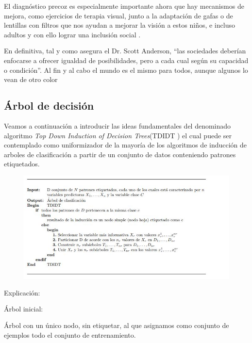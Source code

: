 \documentclass[10pt]{article}
\begin{document}
El diagnóstico precoz es especialmente importante ahora que hay mecanismos de mejora, como ejercicios de terapia visual, junto a la adaptación de gafas o de lentillas con filtros que nos ayudan a mejorar la visión a estos niños, e incluso adultos y con ello lograr una inclusión social \cite{IEEEreferencias:Ref26}.

En definitiva, tal y como asegura el Dr. Scott Anderson, “las sociedades deberían enfocarse a ofrecer igualdad de posibilidades, pero a cada cual según su capacidad o condición”. Al fin y al cabo el mundo es el mismo para todos, aunque algunos lo vean de otro color \cite{IEEEreferencias:Ref33}

\subsection{Árbol de decisión}

Veamos a continuación a introducir las ideas fundamentales del denominado algoritmo \textit{Top Down Induction of Decision Trees}(TDIDT ) el cual puede ser contemplado como uniformizador de la mayoría de los algoritmos de inducción de arboles de clasificación a partir de un conjunto de datos conteniendo patrones etiquetados. \cite{IEEEreferencias:Ref15}
\begin{figure}[H]
	\begin{center}
\includegraphics[scale = 0.85]{Imagenes/algoritmo.JPG}
	\end{center} 
\end{figure}

\setlength{\parskip}{2mm}

Explicación:

Árbol inicial:

Árbol con un único nodo, sin etiquetar, al que asignamos como conjunto de ejemplos todo el conjunto de entrenamiento.
\end{document}
